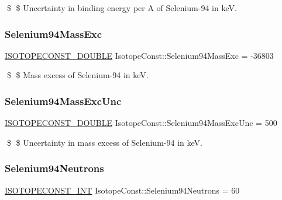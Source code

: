 \$ \$ Uncertainty in binding energy per A of Selenium-\/94 in keV. \mbox{\label{group___isotope_const-_selenium-_se94_ga8b91c5dce31890ae94450ae8794dda6d}} 
\subsubsection{\texorpdfstring{Selenium94\+Mass\+Exc}{Selenium94MassExc}}
{\footnotesize\ttfamily \mbox{\hyperlink{group___isotope_const-_macros_ga8f45a7272ce02c0b4c65c44636ed719a}{I\+S\+O\+T\+O\+P\+E\+C\+O\+N\+S\+T\+\_\+\+D\+O\+U\+B\+LE}} Isotope\+Const\+::\+Selenium94\+Mass\+Exc = -\/36803}

\$ \$ Mass excess of Selenium-\/94 in keV. \mbox{\label{group___isotope_const-_selenium-_se94_gac9f421a07aa9925da42a7c95f72d4660}} 
\subsubsection{\texorpdfstring{Selenium94\+Mass\+Exc\+Unc}{Selenium94MassExcUnc}}
{\footnotesize\ttfamily \mbox{\hyperlink{group___isotope_const-_macros_ga8f45a7272ce02c0b4c65c44636ed719a}{I\+S\+O\+T\+O\+P\+E\+C\+O\+N\+S\+T\+\_\+\+D\+O\+U\+B\+LE}} Isotope\+Const\+::\+Selenium94\+Mass\+Exc\+Unc = 500}

\$ \$ Uncertainty in mass excess of Selenium-\/94 in keV. \mbox{\label{group___isotope_const-_selenium-_se94_gaa2cf6fda8186c1a0b33721049ee54168}} 
\subsubsection{\texorpdfstring{Selenium94\+Neutrons}{Selenium94Neutrons}}
{\footnotesize\ttfamily \mbox{\hyperlink{group___isotope_const-_macros_ga5f18360b3e99483a35c32d789e62621c}{I\+S\+O\+T\+O\+P\+E\+C\+O\+N\+S\+T\+\_\+\+I\+NT}} Isotope\+Const\+::\+Selenium94\+Neutrons = 60}

